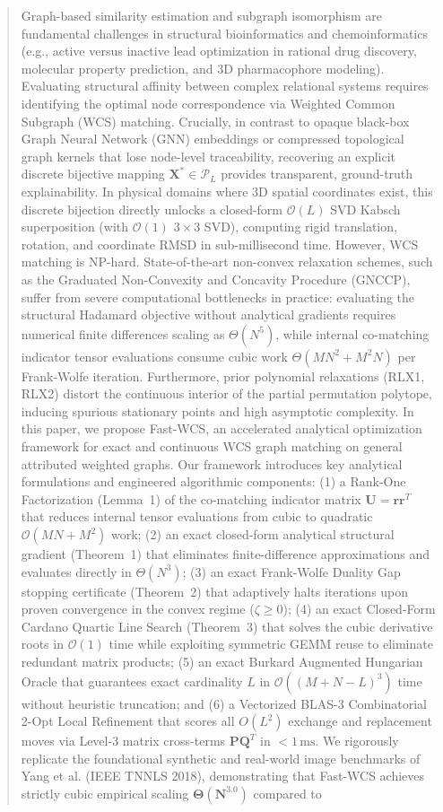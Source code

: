 \documentclass[conference]{IEEEtran}
\begin{document}
\begin{abstract}
Graph-based similarity estimation and subgraph isomorphism are fundamental challenges in structural bioinformatics and chemoinformatics (e.g., active versus inactive lead optimization in rational drug discovery, molecular property prediction, and 3D pharmacophore modeling). Evaluating structural affinity between complex relational systems requires identifying the optimal node correspondence via Weighted Common Subgraph (WCS) matching. Crucially, in contrast to opaque black-box Graph Neural Network (GNN) embeddings or compressed topological graph kernels that lose node-level traceability, recovering an explicit discrete bijective mapping $\mathbf{X}^* \in \mathcal{P}_L$ provides transparent, ground-truth explainability. In physical domains where 3D spatial coordinates exist, this discrete bijection directly unlocks a closed-form $\mathcal{O}(L)$ SVD Kabsch superposition (with $\mathcal{O}(1)$ $3 \times 3$ SVD), computing rigid translation, rotation, and coordinate RMSD in sub-millisecond time. However, WCS matching is NP-hard. State-of-the-art non-convex relaxation schemes, such as the Graduated Non-Convexity and Concavity Procedure (GNCCP), suffer from severe computational bottlenecks in practice: evaluating the structural Hadamard objective without analytical gradients requires numerical finite differences scaling as $\Theta(N^5)$, while internal co-matching indicator tensor evaluations consume cubic work $\Theta(MN^2 + M^2N)$ per Frank-Wolfe iteration. Furthermore, prior polynomial relaxations (RLX1, RLX2) distort the continuous interior of the partial permutation polytope, inducing spurious stationary points and high asymptotic complexity. In this paper, we propose Fast-WCS, an accelerated analytical optimization framework for exact and continuous WCS graph matching on general attributed weighted graphs. Our framework introduces key analytical formulations and engineered algorithmic components: (1) a Rank-One Factorization (Lemma~1) of the co-matching indicator matrix $\mathbf{U} = \mathbf{r}\mathbf{r}^T$ that reduces internal tensor evaluations from cubic to quadratic $\mathcal{O}(MN + M^2)$ work; (2) an exact closed-form analytical structural gradient (Theorem~1) that eliminates finite-difference approximations and evaluates directly in $\Theta(N^3)$; (3) an exact Frank-Wolfe Duality Gap stopping certificate (Theorem~2) that adaptively halts iterations upon proven convergence in the convex regime ($\zeta \geq 0$); (4) an exact Closed-Form Cardano Quartic Line Search (Theorem~3) that solves the cubic derivative roots in $\mathcal{O}(1)$ time while exploiting symmetric GEMM reuse to eliminate redundant matrix products; (5) an exact Burkard Augmented Hungarian Oracle that guarantees exact cardinality $L$ in $\mathcal{O}((M+N-L)^3)$ time without heuristic truncation; and (6) a Vectorized BLAS-3 Combinatorial 2-Opt Local Refinement that scores all $O(L^2)$ exchange and replacement moves via Level-3 matrix cross-terms $\mathbf{P}\mathbf{Q}^T$ in $< 1\,\text{ms}$. We rigorously replicate the foundational synthetic and real-world image benchmarks of Yang et al. (IEEE TNNLS 2018), demonstrating that Fast-WCS achieves strictly cubic empirical scaling $\mathbf{\Theta(N^{3.0})}$ compared to 
\end{abstract}
\end{document}
